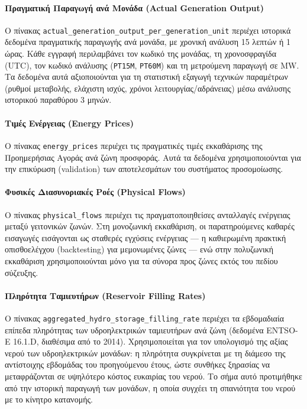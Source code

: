 \paragraph{Πραγματική Παραγωγή ανά Μονάδα (Actual Generation Output)}
Ο πίνακας \texttt{actual\_generation\_output\_per\_generation\_unit} περιέχει ιστορικά δεδομένα πραγματικής παραγωγής ανά μονάδα, με χρονική ανάλυση 15 λεπτών ή 1 ώρας. Κάθε εγγραφή περιλαμβάνει τον κωδικό της μονάδας, τη χρονοσφραγίδα (UTC), τον κωδικό ανάλυσης (\texttt{PT15M}, \texttt{PT60M}) και τη μετρούμενη παραγωγή σε MW. Τα δεδομένα αυτά αξιοποιούνται για τη στατιστική εξαγωγή τεχνικών παραμέτρων (ρυθμοί μεταβολής, ελάχιστη ισχύς, χρόνοι λειτουργίας/αδράνειας) μέσω ανάλυσης ιστορικού παραθύρου 3 μηνών.

\paragraph{Τιμές Ενέργειας (Energy Prices)}
Ο πίνακας \texttt{energy\_prices} περιέχει τις πραγματικές τιμές εκκαθάρισης της Προημερήσιας Αγοράς ανά ζώνη προσφοράς. Αυτά τα δεδομένα χρησιμοποιούνται για την επικύρωση (validation) των αποτελεσμάτων του συστήματος προσομοίωσης.

\paragraph{Φυσικές Διασυνοριακές Ροές (Physical Flows)}
Ο πίνακας \texttt{physical\_flows} περιέχει τις πραγματοποιηθείσες ανταλλαγές ενέργειας μεταξύ γειτονικών ζωνών. Στη μονοζωνική εκκαθάριση, οι παρατηρούμενες καθαρές εισαγωγές εισάγονται ως σταθερές εγχύσεις ενέργειας --- η καθιερωμένη πρακτική οπισθοελέγχου (backtesting) για μεμονωμένες ζώνες --- ενώ στην πολυζωνική εκκαθάριση χρησιμοποιούνται μόνο για τα σύνορα προς ζώνες εκτός του πεδίου σύζευξης.

\paragraph{Πληρότητα Ταμιευτήρων (Reservoir Filling Rates)}
Ο πίνακας \texttt{aggregated\_hydro\_storage\_filling\_rate} περιέχει τα εβδομαδιαία επίπεδα πληρότητας των υδροηλεκτρικών ταμιευτήρων ανά ζώνη (δεδομένα ENTSO-E 16.1.D, διαθέσιμα από το 2014). Χρησιμοποιείται για τον υπολογισμό της αξίας νερού των υδροηλεκτρικών μονάδων: η πληρότητα συγκρίνεται με τη διάμεσο της αντίστοιχης εβδομάδας του προηγούμενου έτους, ώστε συνθήκες ξηρασίας να μεταφράζονται σε υψηλότερο κόστος ευκαιρίας του νερού. Το σήμα αυτό προτιμήθηκε από την ιστορική παραγωγή των μονάδων, η οποία συγχέει τη σπανιότητα του νερού με το κίνητρο κατανομής.


